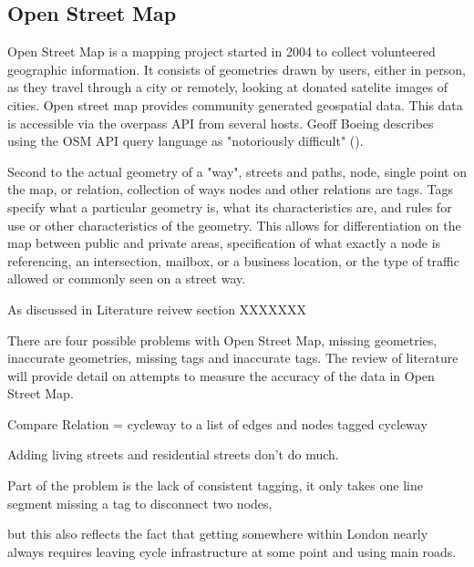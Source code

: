 
\subsection{Open Street Map}


Open Street Map is a mapping project started in 2004 to collect volunteered geographic information. It consists of geometries drawn by users, either in person, as they travel through a city or remotely, looking at donated satelite images of cities. Open street map provides community generated geospatial data. This data is accessible via the overpass API from several hosts. Geoff Boeing describes using the OSM API query language as "notoriously difficult" (\cite{osmnx}). 




Second to the actual geometry of a "way", streets and paths, node, single point on the map, or relation, collection of ways nodes and other relations are tags. Tags specify what a particular geometry is, what its characteristics are, and rules for use or other characteristics of the geometry. This allows for differentiation on the map between public and private areas, specification of what exactly a node is referencing, an intersection, mailbox, or a business location, or the type of traffic allowed or commonly seen on a street way. 



As discussed in Literature reivew section XXXXXXX
 
 
 There are four possible problems with Open Street Map, missing geometries, inaccurate geometries, missing tags and inaccurate tags. The review of literature will provide detail on attempts to measure the accuracy of the data in Open Street Map.
 
 



Compare Relation = cycleway to a list of edges and nodes tagged cycleway

Adding living streets and residential streets don't do much. 

Part of the problem is the lack of consistent tagging, it only takes one line segment missing a tag to disconnect two nodes,

but this also reflects the fact that getting somewhere within London nearly always requires leaving cycle infrastructure at some point and using main roads. 

